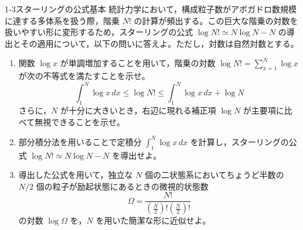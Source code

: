 
\begin{mondai}{1-3}{スターリングの公式}{基本}
統計力学において，構成粒子数がアボガドロ数規模に達する多体系を扱う際，階乗 $N!$ の計算が頻出する。この巨大な階乗の対数を扱いやすい形に変形するため，スターリングの公式 $\log N! \simeq N \log N - N$ の導出とその適用について，以下の問いに答えよ。ただし，対数は自然対数とする。

\begin{enumerate}
  \item 関数 $\log x$ が単調増加することを用いて，階乗の対数 $\log N! = \sum_{x=1}^N \log x$ が次の不等式を満たすことを示せ。
  \begin{equation*}
  \int_1^N \log x \, dx \le \log N! \le \int_1^N \log x \, dx + \log N
  \end{equation*}
  さらに，$N$ が十分に大きいとき，右辺に現れる補正項 $\log N$ が主要項に比べて無視できることを示せ。

  \item 部分積分法を用いることで定積分 $\int_1^N \log x \, dx$ を計算し，スターリングの公式 $\log N! \simeq N \log N - N$ を導出せよ。

  \item 導出した公式を用いて，独立な $N$ 個の二状態系においてちょうど半数の $N/2$ 個の粒子が励起状態にあるときの微視的状態数
  \begin{equation*}
  \Omega = \frac{N!}{\left(\frac{N}{2}\right)! \left(\frac{N}{2}\right)!}
  \end{equation*}
  の対数 $\log \Omega$ を，$N$ を用いた簡潔な形に近似せよ。
\end{enumerate}
\end{mondai}


